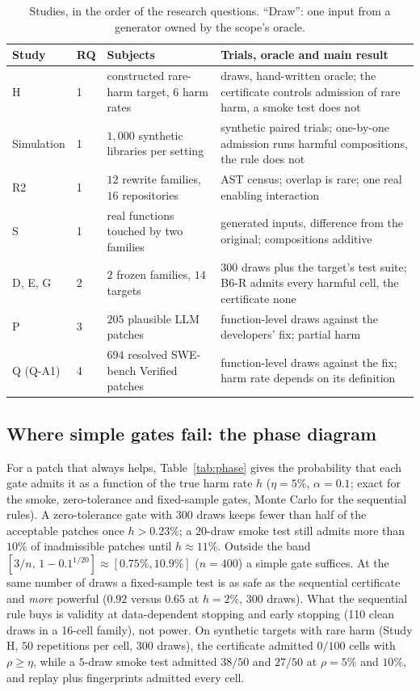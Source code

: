 \begin{table}[t]
\centering\footnotesize
\caption{Studies, in the order of the research questions.  ``Draw'': one input from a generator owned by the scope's oracle.}
\label{tab:studies}
\begin{tabular}{@{}lllp{4.3cm}@{}}
\toprule
Study & RQ & Subjects & Trials, oracle and main result \\
\midrule
H & 1 & constructed rare-harm target, $6$ harm rates & draws, hand-written oracle; the certificate controls admission of rare harm, a smoke test does not \\
Simulation & 1 & $1{,}000$ synthetic libraries per setting & synthetic paired trials; one-by-one admission runs harmful compositions, the rule does not \\
R2 & 1 & $12$ rewrite families, $16$ repositories & AST census; overlap is rare; one real enabling interaction \\
S & 1 & real functions touched by two families & generated inputs, difference from the original; compositions additive \\
D, E, G & 2 & $2$ frozen families, $14$ targets & $300$ draws plus the target's test suite; B6-R admits every harmful cell, the certificate none \\
P & 3 & $205$ plausible LLM patches & function-level draws against the developers' fix; partial harm \\
Q (Q-A1) & 4 & $694$ resolved SWE-bench Verified patches & function-level draws against the fix; harm rate depends on its definition \\
\bottomrule
\end{tabular}
\end{table}

\subsection{Where simple gates fail: the phase diagram}
\label{sec:eval-phase}
For a patch that always helps, Table~\ref{tab:phase} gives the probability that each gate admits it as a function of the true
harm rate $h$ ($\eta=5\%$, $\alpha=0.1$; exact for the smoke, zero-tolerance and fixed-sample gates, Monte Carlo for the
sequential rules).  A zero-tolerance gate with $300$ draws keeps fewer than half of the acceptable patches once $h>0.23\%$; a
$20$-draw smoke test still admits more than $10\%$ of inadmissible patches until $h\approx11\%$.  Outside the band
$[3/n,\,1-0.1^{1/20}]\approx[0.75\%,10.9\%]$ ($n=400$) a simple gate suffices.  At the same number of draws a fixed-sample test is
as safe as the sequential certificate and \emph{more} powerful ($0.92$ versus $0.65$ at $h=2\%$, $300$ draws).  What the
sequential rule buys is validity at data-dependent stopping and early stopping (110 clean draws in a 16-cell family), not power.
On synthetic targets with rare harm (Study H, $50$ repetitions per cell, $300$ draws), the certificate admitted $0/100$ cells with
$\rho\ge\eta$, while a $5$-draw smoke test admitted $38/50$ and $27/50$ at $\rho=5\%$ and $10\%$, and replay plus fingerprints
admitted every cell.

